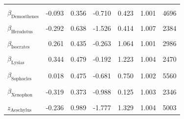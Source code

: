 \begin{longtable}{lrrrrrr}
\cellcolor{gray!10}{$\beta_{\text{Antiphon}}$} & \cellcolor{gray!10}{0.203} & \cellcolor{gray!10}{0.441} & \cellcolor{gray!10}{-0.363} & \cellcolor{gray!10}{0.997} & \cellcolor{gray!10}{1.002} & \cellcolor{gray!10}{3864}\\
$\beta_{\text{Demosthenes}}$ & -0.093 & 0.356 & -0.710 & 0.423 & 1.001 & 4696\\
\cellcolor{gray!10}{$\beta_{\text{Euripides}}$} & \cellcolor{gray!10}{-0.044} & \cellcolor{gray!10}{0.517} & \cellcolor{gray!10}{-0.838} & \cellcolor{gray!10}{0.717} & \cellcolor{gray!10}{1.004} & \cellcolor{gray!10}{6268}\\
$\beta_{\text{Herodotus}}$ & -0.292 & 0.638 & -1.526 & 0.414 & 1.007 & 2384\\
\cellcolor{gray!10}{$\beta_{\text{Isaeus}}$} & \cellcolor{gray!10}{-0.041} & \cellcolor{gray!10}{0.507} & \cellcolor{gray!10}{-0.835} & \cellcolor{gray!10}{0.687} & \cellcolor{gray!10}{1.005} & \cellcolor{gray!10}{5029}\\
$\beta_{\text{Isocrates}}$ & 0.261 & 0.435 & -0.263 & 1.064 & 1.001 & 2986\\
\cellcolor{gray!10}{$\beta_{\text{Lycurgus}}$} & \cellcolor{gray!10}{0.034} & \cellcolor{gray!10}{0.501} & \cellcolor{gray!10}{-0.722} & \cellcolor{gray!10}{0.846} & \cellcolor{gray!10}{1.007} & \cellcolor{gray!10}{6142}\\
$\beta_{\text{Lysias}}$ & 0.344 & 0.479 & -0.192 & 1.223 & 1.004 & 2470\\
\cellcolor{gray!10}{$\beta_{\text{Plato}}$} & \cellcolor{gray!10}{-0.065} & \cellcolor{gray!10}{0.346} & \cellcolor{gray!10}{-0.649} & \cellcolor{gray!10}{0.455} & \cellcolor{gray!10}{1.004} & \cellcolor{gray!10}{4615}\\
$\beta_{\text{Sophocles}}$ & 0.018 & 0.475 & -0.681 & 0.750 & 1.002 & 5560\\
\cellcolor{gray!10}{$\beta_{\text{Thucydides}}$} & \cellcolor{gray!10}{-0.192} & \cellcolor{gray!10}{0.399} & \cellcolor{gray!10}{-0.909} & \cellcolor{gray!10}{0.322} & \cellcolor{gray!10}{1.001} & \cellcolor{gray!10}{3511}\\
$\beta_{\text{Xenophon}}$ & -0.319 & 0.373 & -0.988 & 0.125 & 1.003 & 2346\\
\cellcolor{gray!10}{$z_{\text{Aeschines}}$} & \cellcolor{gray!10}{0.456} & \cellcolor{gray!10}{0.947} & \cellcolor{gray!10}{-1.059} & \cellcolor{gray!10}{1.912} & \cellcolor{gray!10}{1.002} & \cellcolor{gray!10}{4856}\\
$z_{\text{Aeschylus}}$ & -0.236 & 0.989 & -1.777 & 1.329 & 1.004 & 5003\\

\end{longtable}
